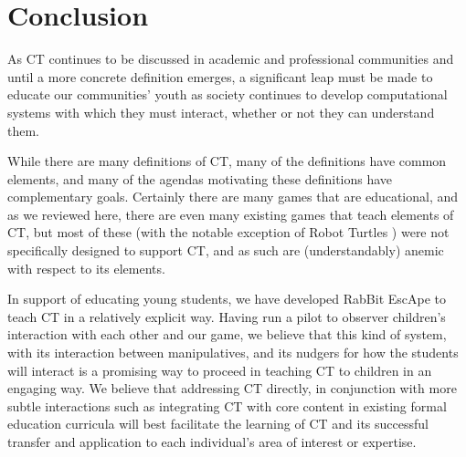 \documentclass{acm_proc_article-sp}
\begin{document}
\section{Conclusion}
\label{sec:conclusion}
\sloppy As CT continues to be discussed in academic and professional communities and until a more concrete definition emerges, a significant leap must be made to educate our communities' youth as society continues to develop computational systems with which they must interact, whether or not they can understand them. 

While there are many definitions of CT, many of the definitions have common elements, and many of the agendas motivating these definitions have complementary goals. 
Certainly there are many games that are educational, and as we reviewed here, there are even many existing games that teach elements of CT, but most of these (with the notable exception of Robot Turtles \cite{robotturtles}) were not specifically designed to support CT, and as such are (understandably) anemic with respect to its elements.


In support of educating young students, we have developed RabBit EscApe to teach CT in a relatively explicit way.
Having run a pilot to observer children's interaction with each other and our game, we believe that this kind of system, with its interaction between manipulatives, and its nudgers for how the students will interact is a promising way to proceed in teaching CT to children in an engaging way.
We believe that addressing CT directly, in conjunction with more subtle interactions such as integrating CT with core content in existing formal education curricula \cite{tatarce21} will best facilitate the learning of CT and its successful transfer and application to each individual's area of interest or expertise.
\end{document}
